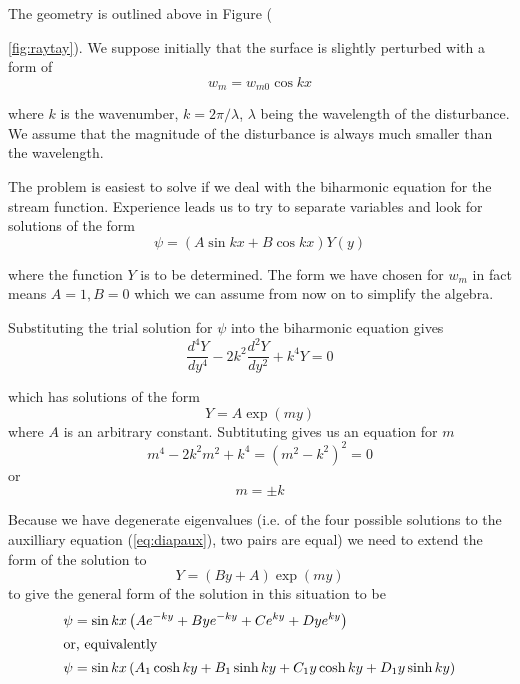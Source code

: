 \documentclass[10pt]{article}
\begin{document}
	The geometry is outlined above in Figure ({\ref{fig:raytay}). We suppose
	initially that the surface is slightly perturbed with a form of
		\begin{equation}
			w_m = w_{m0} \cos kx
		\end{equation}
		
	where $k$ is the wavenumber, $k=2\pi / \lambda$, $\lambda$ being the wavelength
	of the disturbance. We assume that the magnitude of the disturbance is always
	much smaller than the wavelength. 
	
	The problem is easiest to solve if we deal with the biharmonic equation
	for the stream function. Experience leads us to try to separate 
	variables and look for solutions of the form
		\begin{equation}
			\psi = \left( A \sin kx + B \cos kx \right ) Y(y) 
		\end{equation}
	
	where the function $Y$ is to be determined. The form we have chosen
	for $w_m$ in fact means $A=1,B=0$ which we can assume from now on to
	simplify the algebra.
	
	Substituting the trial solution for $\psi$ into the biharmonic
	equation gives
		\begin{equation}
			\frac{d^4 Y}{d y^4} -2k^2 \frac{d^2 Y}{dy^2} +k^4 Y = 0
		\end{equation} 
	 
	 which has solutions of the form 
	 	\begin{equation}
	 		Y = A \exp(m y)
	 	\end{equation}
	where $A$ is an arbitrary constant.	Subtituting gives us an equation for $m$	
		\begin{equation}
			m^4 - 2 k^2 m^2 + k^4 = (m^2 - k^2)^2 = 0
			\label{eq:diapaux}
		\end{equation}
	or
		\begin{equation}
			m = \pm k
		\end{equation}

	Because we have degenerate eigenvalues (i.e. of the four
	possible solutions to the auxilliary equation (\ref{eq:diapaux}),
	two pairs are equal) we need to extend the form of the solution 
	to 
		\begin{equation}
			Y = (By+A) \exp(m y)
		\end{equation}	
	to give the general form of the solution in this 
	situation to be
		\begin{align}
			\psi &= \sin kx \left( A e^{-ky} + B y e^{-ky} + C e^{ky} + D y e^{ky} \right)
			\label{eq:biharmsoln1} \\
		\intertext{or, equivalently}
			\psi &= \sin kx \left( A_1 \cosh ky + B_1 \sinh ky + C_1 y \cosh ky + D_1 y \sinh ky  \right)
			\label{eq:biharmsoln2} 
		\end{align}	
	
}
\end{document}
